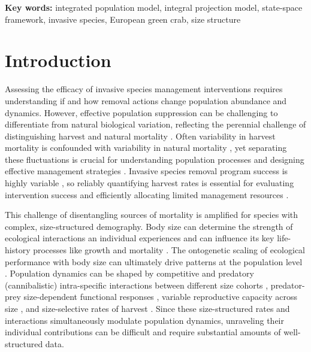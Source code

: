 \documentclass{article}
\begin{document}
\textbf{Key words:} integrated population model, integral projection model, state-space framework, invasive species, European green crab, size structure

\newpage

\section{Introduction}

Assessing the efficacy of invasive species management interventions requires understanding if and how removal actions change population abundance and dynamics. However, effective population suppression can be challenging to differentiate from natural biological variation, reflecting the perennial challenge of distinguishing harvest and natural mortality \parencite{aanes2007estimation}. Often variability in harvest mortality is confounded with variability in natural mortality \parencite{lewy2003modelling}, yet separating these fluctuations is crucial for understanding population processes and designing effective management strategies \parencite{walters2004fisheries}. Invasive species removal program success is highly variable \parencite{prior2018does}, so reliably quantifying harvest rates is essential for evaluating intervention success and efficiently allocating limited management resources \parencite{green2021functional}.

This challenge of disentangling sources of mortality is amplified for species with complex, size-structured demography. Body size can determine the strength of ecological interactions an individual experiences and can influence its key life-history processes like growth and mortality \parencite{de2003influence}. The ontogenetic scaling of ecological performance with body size can ultimately drive patterns at the population level \parencite{werner1994ontogenetic}. Population dynamics can be shaped by competitive and predatory (cannibalistic) intra-specific interactions between different size cohorts \parencite{claessen2004population}, predator-prey size-dependent functional responses \parencite{aljetlawi2004prey}, variable reproductive capacity across size \parencite{hixon2014boffffs}, and size-selective rates of harvest \parencite{tu2018fishing}. Since these size-structured rates and interactions simultaneously modulate population dynamics, unraveling their individual contributions can be difficult and require substantial amounts of well-structured data. 
\end{document}
